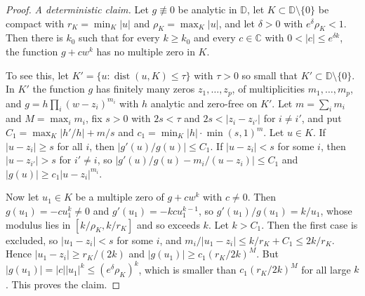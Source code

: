 \documentclass[11pt]{amsart}
\theoremstyle{definition}
\theoremstyle{remark}
\numberwithin{equation}{section}
\newcommand{\C}{\mathbb{C}}
\newcommand{\D}{\mathbb{D}}
\DeclareMathOperator{\dist}{dist}
\begin{document}
\begin{proof}
\emph{A deterministic claim.} Let $g\not\equiv0$ be analytic in $\D$, let $K\subset\D\setminus\{0\}$ be compact with $r_K=\min_K|u|$ and $\rho_K=\max_K|u|$, and let $\delta>0$ with $e^\delta\rho_K<1$. Then there is $k_0$ such that for every $k\ge k_0$ and every $c\in\C$ with $0<|c|\le e^{\delta k}$, the function $g+cw^k$ has no multiple zero in $K$.

To see this, let $K'=\{u:\dist(u,K)\le\tau\}$ with $\tau>0$ so small that $K'\subset\D\setminus\{0\}$. In $K'$ the function $g$ has finitely many zeros $z_1,\dots,z_p$, of multiplicities $m_1,\dots,m_p$, and $g=h\prod_i(w-z_i)^{m_i}$ with $h$ analytic and zero-free on $K'$. Let $m=\sum_im_i$ and $M=\max_im_i$, fix $s>0$ with $2s<\tau$ and $2s<|z_i-z_{i'}|$ for $i\ne i'$, and put $C_1=\max_K|h'/h|+m/s$ and $c_1=\min_K|h|\cdot\min(s,1)^m$. Let $u\in K$. If $|u-z_i|\ge s$ for all $i$, then $|g'(u)/g(u)|\le C_1$. If $|u-z_i|<s$ for some $i$, then $|u-z_{i'}|>s$ for $i'\ne i$, so $|g'(u)/g(u)-m_i/(u-z_i)|\le C_1$ and $|g(u)|\ge c_1|u-z_i|^{m_i}$.

Now let $u_1\in K$ be a multiple zero of $g+cw^k$ with $c\ne0$. Then $g(u_1)=-cu_1^k\ne0$ and $g'(u_1)=-kcu_1^{k-1}$, so $g'(u_1)/g(u_1)=k/u_1$, whose modulus lies in $[k/\rho_K,k/r_K]$ and so exceeds $k$. Let $k>C_1$. Then the first case is excluded, so $|u_1-z_i|<s$ for some $i$, and $m_i/|u_1-z_i|\le k/r_K+C_1\le2k/r_K$. Hence $|u_1-z_i|\ge r_K/(2k)$ and $|g(u_1)|\ge c_1(r_K/2k)^M$. But $|g(u_1)|=|c||u_1|^k\le(e^\delta\rho_K)^k$, which is smaller than $c_1(r_K/2k)^M$ for all large $k$. This proves the claim.


\end{proof}
\end{document}
